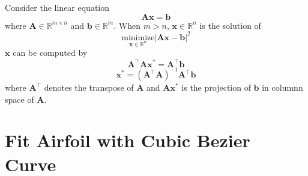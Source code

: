 \documentclass{turgon}
\begin{document}
Consider the linear equation
\begin{equation}
    \mathbf{A} \mathbf{x} = \mathbf{b}
    \label{e:lls:leq}
\end{equation}
where $\mathbf{A} \in \mathbb{R}^{m \times n}$ and $\mathbf{b} \in \mathbb{R}^m$. When $m>n$,
$\mathbf{x} \in \mathbb{R}^n$ is the solution of
\begin{equation*}
    \underset{\mathbf{x} \in \mathbb{R}^n}{\text{minimize}} \left| \mathbf{A} \mathbf{x} - \mathbf{b} \right|^2
\end{equation*}
$\mathbf{x}$ can be computed by
\begin{equation*}
    \mathbf{A}^\top \mathbf{A} \mathbf{x}^* = \mathbf{A}^\top \mathbf{b}
\end{equation*}
\begin{equation}
    \mathbf{x}^* = (\mathbf{A}^\top \mathbf{A})^{-1} \mathbf{A}^\top \mathbf{b}
    \label{e:lls:sol}
\end{equation}
where $\mathbf{A}^\top$ denotes the transpose of $\mathbf{A}$ and $\mathbf{A} \mathbf{x}^*$ is the projection of
$\mathbf{b}$ in columnn space of $\mathbf{A}$.

\chapter{Fit Airfoil with Cubic Bezier Curve}

\end{document}
